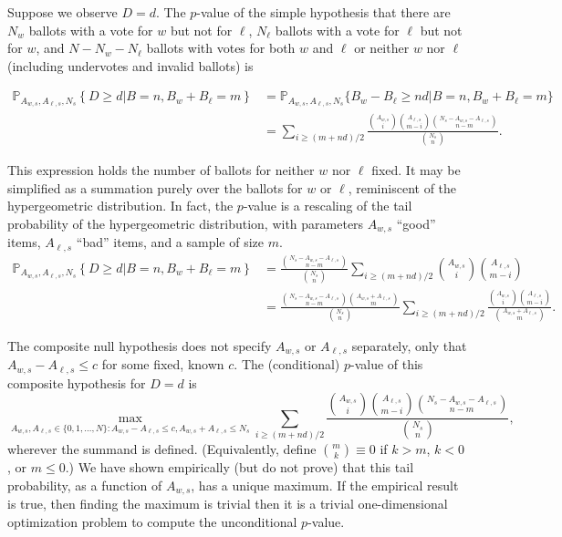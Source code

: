 Suppose we observe $D=d$.
The $p$-value of the simple hypothesis that there are $N_w$ ballots with
a vote for $w$ but not for $\ell$, $N_\ell$ ballots with a vote for $\ell$ but not for $w$, and $N - N_w - N_\ell$ ballots with votes for both $w$ and $\ell$ or neither $w$ nor $\ell$ (including undervotes and
invalid ballots) is

\begin{equation}
\begin{aligned}
   \mathbb{P}_{A_{w,s}, A_{\ell,s}, N_s} \left \{ D \geq d \vert B = n, B_w+B_\ell = m \right \} 
  & = \mathbb{P}_{A_{w,s}, A_{\ell,s}, N_s}\{ B_w - B_\ell \geq nd \vert B = n, B_w+B_\ell = m \} \\
   & = \sum_{i \geq (m+nd)/2} 
         \frac{ {A_{w,s} \choose i}{A_{\ell,s} \choose m-i}{N_s - A_{w,s} - A_{\ell,s} \choose n-m}}{{N_s \choose n}}.
\end{aligned}
\end{equation}

This expression holds the number of ballots for neither $w$ nor $\ell$ fixed.
It may be simplified as a summation purely over the ballots for $w$ or $\ell$,
 reminiscent of the hypergeometric distribution.
In fact, the $p$-value is a rescaling of the tail probability of the hypergeometric distribution,
with parameters $A_{w,s}$ ``good'' items, $A_{\ell,s}$ ``bad'' items, and a sample of size $m$.
\begin{equation}
\begin{aligned}
   \mathbb{P}_{A_{w,s}, A_{\ell,s}, N_s} \left \{ D \geq d \vert B = n, B_w+B_\ell = m \right \} 
   & =  \frac{ {N_s - A_{w,s} - A_{\ell,s} \choose n-m}}{{N_s \choose n}}\sum_{i \geq (m+nd)/2} {A_{w,s} \choose i}{A_{\ell,s} \choose m-i} \\
   & =  \frac{ {N_s - A_{w,s} - A_{\ell,s} \choose n-m} {A_{w,s}+A_{\ell,s} \choose m}}{{N_s \choose n}}\sum_{i \geq (m+nd)/2} \frac{ {A_{w,s} \choose i}{A_{\ell,s} \choose m-i} }{{A_{w,s}+A_{\ell,s} \choose m}}.
\end{aligned}
\end{equation}

The composite null hypothesis does not specify $A_{w,s}$ or $A_{\ell,s}$ separately, only 
that $A_{w,s} - A_{\ell,s} \le c$ for
some fixed, known $c$.
The (conditional) $p$-value of this composite hypothesis for $D=d$ is
\begin{equation}
  \max_{A_{w,s}, A_{\ell,s} \in \{0, 1, \ldots, N \}: A_{w,s} - A_{\ell,s} \le c, A_{w,s} + A_{\ell,s} \le N_s}
   \sum_{i \geq (m+nd)/2} 
         \frac{ {A_{w,s} \choose i}{A_{\ell,s} \choose m-i}{N_s - A_{w,s} - A_{\ell,s} \choose n-m}}{{N_s \choose n}},
\end{equation}
wherever the summand is defined. 
(Equivalently, define ${m \choose k} \equiv 0$ if $k > m$, $k < 0$, or $m \le 0$.)
We have shown empirically (but do not prove) that this tail probability, as a function of $A_{w,s}$,
has a unique maximum.
If the empirical result is true, then finding the maximum is trivial
then it is a trivial one-dimensional optimization problem to compute the unconditional $p$-value.
